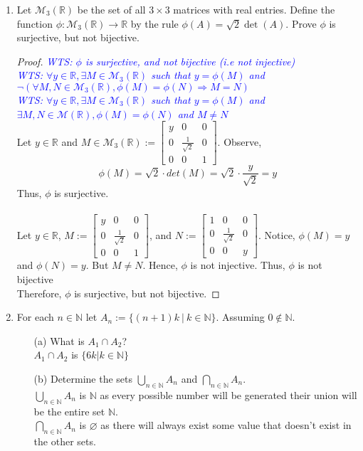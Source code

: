 \documentclass[12pt]{article}
\newcommand{\R}{\mathbb{R}}
\newcommand{\N}{\mathbb{N}}
\newcommand{\wts}[1]{\textit{\textcolor{blue}{WTS: #1}}\\}
\begin{document}
\begin{enumerate}
\item Let $\mathcal{M}_3(\R)$ be the set of all $3 \times 3$ matrices with real entries. Define the function $\phi : \mathcal{M}_3(\R) \to \mathbb{R}$ by the rule $\phi(A) = \sqrt{2} \det(A)$. Prove $\phi$ is surjective, but not bijective.
\begin{proof}
	\wts{$ \phi $ is surjective, and not bijective (i.e not injective)}
	\wts{$\forall y\in \R,\exists M\in\mathcal{M}_3(\R)$ such that $ y=\phi(M) $ and $ \neg (\forall M,N\in\mathcal{M}_3(\R),\phi(M)=\phi(N)\Rightarrow M=N)$}
	\wts{$\forall y\in \R,\exists M\in\mathcal{M}_3(\R)$ such that $ y=\phi(M) $ and $\exists M,N\in\mathcal{M}(\R),\phi(M)=\phi(N) $ and $ M \neq N $}
	Let $ y\in\R $ and $ M\in\mathcal{M}_3(\R) := \begin{bmatrix}
	y & 0 & 0 \\ 
	0 & \frac{1}{\sqrt{2}} & 0\\ 
	0 & 0 & 1
	\end{bmatrix} $. Observe, 
		\[ \phi(M) = \sqrt{2}\cdot det(M) = \sqrt{2}\cdot \frac{y}{\sqrt{2}} = y \]
	Thus, $ \phi $ is surjective.\\
	\\
	Let $y\in\R$, $ M := \begin{bmatrix}
	y & 0 & 0 \\ 
	0 & \frac{1}{\sqrt{2}} & 0\\ 
	0 & 0 & 1
	\end{bmatrix} $, and $ N:= \begin{bmatrix}
	1 & 0 & 0 \\ 
	0 & \frac{1}{\sqrt{2}} & 0\\ 
	0 & 0 & y
	\end{bmatrix} $. Notice, $ \phi(M) = y $ and $ \phi(N)=y $. But $ M \neq N $. Hence, $ \phi  $ is not injective. Thus, $ \phi $ is not bijective\\
	Therefore, $ \phi $ is surjective, but not bijective.
\end{proof}
\item For each $n \in \mathbb{N}$ let $A_n := \{  (n+1)k ~|~ k \in \mathbb{N} \}$. Assuming $ 0\not\in\N  $.
\begin{itemize}
    \item[(a)] What is $A_1 \cap A_2$? \\
    $ A_1 \cap A_2 $ is $ \{6k|k\in\N\} $
    \item[(b)] Determine the sets $\bigcup_{n \in \mathbb{N}} A_n$ and $\bigcap_{n \in \mathbb{N}} A_n$.\\
    $ \bigcup_{n\in\N}A_n $ is $ \N $ as every possible number will be generated their union will be the entire set $ \N $.\\
    $ \bigcap_{n \in \mathbb{N}} A_n $ is $ \varnothing $ as there will always exist some value that doesn't exist in the other sets. \\
\end{itemize}   


\end{enumerate}
\end{document}
